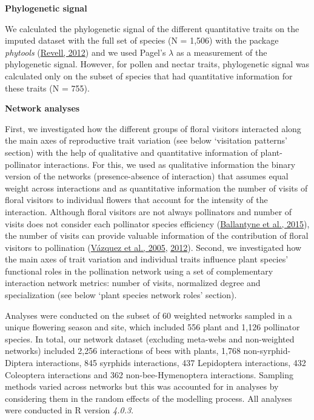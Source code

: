 \documentclass[
  12pt,
  a4paper,
]{article}
\begin{document}
\textbf{Phylogenetic signal}

We calculated the phylogenetic signal of the different quantitative traits on the imputed dataset with the full set of species (N = 1,506) with the package \emph{phytools} (\protect\hyperlink{ref-revell2012}{Revell, 2012}) and we used Pagel's \(\lambda\) as a measurement of the phylogenetic signal. However, for pollen and nectar traits, phylogenetic signal was calculated only on the subset of species that had quantitative information for these traits (N = 755).

\textbf{Network analyses}

First, we investigated how the different groups of floral visitors interacted along the main axes of reproductive trait variation (see below `visitation patterns' section) with the help of qualitative and quantitative information of plant-pollinator interactions. For this, we used as qualitative information the binary version of the networks (presence-absence of interaction) that assumes equal weight across interactions and as quantitative information the number of visits of floral visitors to individual flowers that account for the intensity of the interaction. Although floral visitors are not always pollinators and number of visits does not consider each pollinator species efficiency (\protect\hyperlink{ref-ballantyne2015}{Ballantyne et al., 2015}), the number of visits can provide valuable information of the contribution of floral visitors to pollination (\protect\hyperlink{ref-vazquez2005}{Vázquez et al., 2005}, \protect\hyperlink{ref-vazquez2012}{2012}). Second, we investigated how the main axes of trait variation and individual traits influence plant species' functional roles in the pollination network using a set of complementary interaction network metrics: number of visits, normalized degree and specialization (see below `plant species network roles' section).

Analyses were conducted on the subset of 60 weighted networks sampled in a unique flowering season and site, which included 556 plant and 1,126 pollinator species. In total, our network dataset (excluding meta-webs and non-weighted networks) included 2,256 interactions of bees with plants, 1,768 non-syrphid-Diptera interactions, 845 syrphids interactions, 437 Lepidoptera interactions, 432 Coleoptera interactions and 362 non-bee-Hymenoptera interactions. Sampling methods varied across networks but this was accounted for in analyses by considering them in the random effects of the modelling process. All analyses were conducted in R version \emph{4.0.3}.
\end{document}
